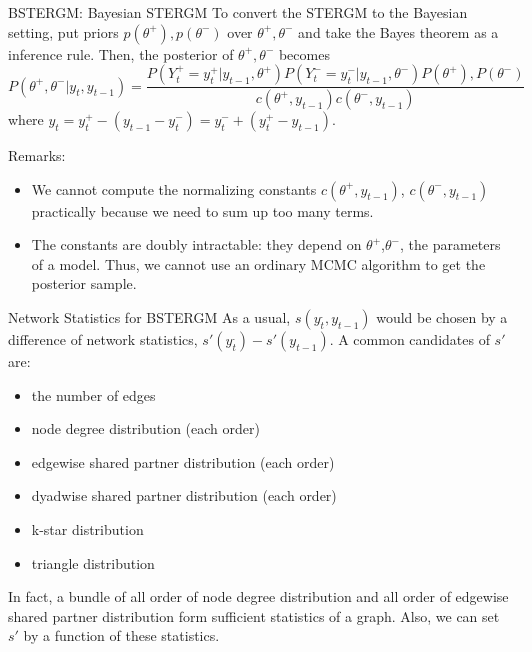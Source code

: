 \documentclass[aspectratio=169,ignorenonframetext,9pt]{beamer}
\theoremstyle{plain}
\theoremstyle{definition}
\begin{document}
\begin{frame}{BSTERGM: Bayesian STERGM}
    To convert the STERGM to the Bayesian setting, put priors $p(\theta^+),p(\theta^-)$ over $\theta^+,\theta^-$ and take the Bayes theorem as a inference rule.
    Then, the posterior of $\theta^+,\theta^-$ becomes
    \[P(\theta^+,\theta^-|y_t, y_{t-1}) = \frac{P(Y_t^+=y_t^+|y_{t-1},\theta^+) P(Y_t^-=y_t^-|y_{t-1},\theta^-)P(\theta^+),P(\theta^-)}{c(\theta^+,y_{t-1})c(\theta^-,y_{t-1})} \]
    where $y_t=y_t^+ - (y_{t-1} - y_t^-) = y_t^- + (y_t^+ - y_{t-1})$.

    Remarks:
    \begin{itemize}
        \item We cannot compute the normalizing constants $c(\theta^+,y_{t-1})$, $c(\theta^-,y_{t-1})$ practically because we need to sum up too many terms.
        \item The constants are doubly intractable: they depend on $\theta^+$,$\theta^-$, the parameters of a model.
            Thus, we cannot use an ordinary MCMC algorithm to get the posterior sample.
    \end{itemize}
\end{frame}

\begin{frame}{Network Statistics for BSTERGM}
    As a usual, $s(y_{t}^.,y_{t-1})$ would be chosen by a difference of network statistics, $s'(y_t^.)-s'(y_{t-1})$.
    A common candidates of $s'$ are:
    \begin{itemize}
        \item the number of edges
        \item node degree distribution (each order)
        \item edgewise shared partner distribution (each order)
        \item dyadwise shared partner distribution (each order)
        \item k-star distribution
        \item triangle distribution
    \end{itemize}
    In fact, a bundle of all order of node degree distribution and all order of edgewise shared partner distribution form sufficient statistics of a graph.
    Also, we can set $s'$ by a function of these statistics.
\end{frame}
\end{document}
